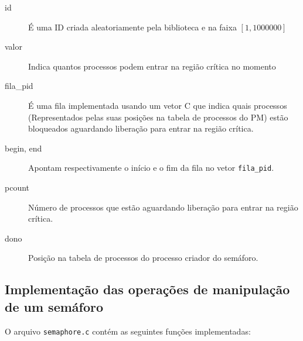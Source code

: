 \documentclass[brazil, a4paper]{scrartcl}
\begin{document}
\begin{description}
	\item[id] É uma ID criada aleatoriamente pela biblioteca e na faixa $[1, 1000000]$
	\item[valor] Indica quantos processos podem entrar na região crítica no momento
	\item[fila\_pid] É uma fila implementada usando um vetor C que indica quais
		processos (Representados pelas suas posições na tabela de processos do
		PM) estão bloqueados aguardando liberação para entrar na região
		crítica.
	\item[begin, end] Apontam respectivamente o início e o fim da fila no vetor
		\texttt{fila\_pid}.
	\item[pcount] Número de processos que estão aguardando liberação para entrar
		na região crítica.
	\item[dono] Posição na tabela de processos do processo criador do semáforo.
\end{description}

\subsection{Implementação das operações de manipulação de um semáforo}
O arquivo \texttt{semaphore.c} contém as seguintes funções implementadas:
\end{document}
